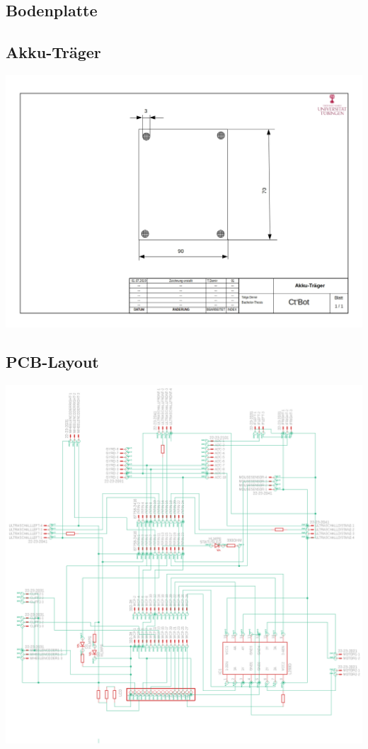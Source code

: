 \documentclass[a4paper,cleardoubleempty,BCOR1cm]{book}
\begin{document}
\subsection{Bodenplatte}
\subsection{Akku-Träger}
\includegraphics[angle=90,origin=c, scale= 0.7]{images/Zeichnung_Akku.jpg}
\subsection{PCB-Layout}
\includegraphics[angle=0,origin=c, scale= 0.75]{images/Layout.png}
\end{document}

